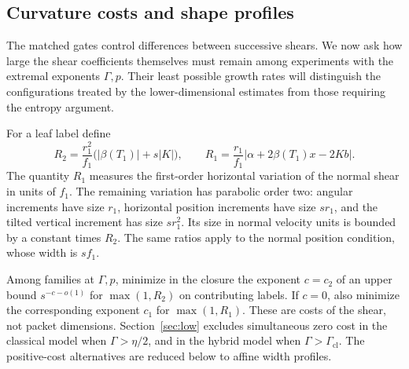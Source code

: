 \subsection{Curvature costs and shape profiles}

The matched gates control differences between successive shears. We now
ask how large the shear coefficients themselves must remain among
experiments with the extremal exponents $\Gamma,p$. Their least possible
growth rates will distinguish the configurations treated by the
lower-dimensional estimates from those requiring the entropy argument.

For a leaf label define
\begin{equation}\label{cyl:costs}
 R_2=\frac{r_1^2}{f_1}\bigl(|\beta(T_1)|+s|K|\bigr),\qquad
 R_1=\frac{r_1}{f_1}|\alpha+2\beta(T_1)x-2Kb|.
\end{equation}
The quantity $R_1$ measures the first-order horizontal variation of the
normal shear in units of $f_1$. The remaining variation has parabolic
order two: angular increments have size $r_1$, horizontal position
increments have size $sr_1$, and the tilted vertical increment has size
$sr_1^2$. Its size in normal velocity units is bounded by a constant
times $R_2$. The same ratios apply to the normal position condition,
whose width is $sf_1$.

Among families at $\Gamma,p$, minimize in the closure the exponent $c=c_2$
of an upper bound $s^{-c-o(1)}$ for $\max(1,R_2)$ on contributing
labels.  If $c=0$, also minimize the corresponding exponent $c_1$ for
$\max(1,R_1)$.  These are costs of the shear, not packet dimensions.
Section~\ref{sec:low} excludes simultaneous zero cost in the classical
model when $\Gamma>\eta/2$, and in the hybrid model when
$\Gamma>\Gamma_{\mathrm{cl}}$. The positive-cost alternatives are
reduced below to affine width profiles.

